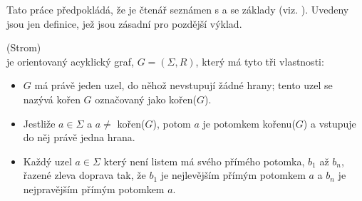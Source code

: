 Tato práce předpokládá, že je čtenář seznámen s  a
se základy  (viz. \cite{MedunaIFJ}).
Uvedeny jsou jen definice, jež jsou zásadní pro pozdější výklad.

\begin{defn}
  (Strom)\\
   je orientovaný acyklický graf, $G = (\Sigma, R)$, který má tyto
  tři vlastnosti:
  \begin{itemize}
    \item   $G$ má právě jeden uzel, do něhož nevstupují žádné hrany;
      tento uzel se nazývá kořen $G$ označovaný jako kořen($G$).
    \item Jestliže $a \in \Sigma$ a $a \neq$ kořen($G$), potom $a$ je
    potomkem kořenu($G$) a vstupuje do něj právě jedna hrana.
    \item   Každý uzel $a \in \Sigma$ který není listem má svého přímého potomka,
      $b_1$ až $b_n$, řazené zleva doprava tak, že $b_1$ je
      nejlevějším přímým potomkem $a$ a $b_n$ je nejpravějším přímým
      potomkem $a$.
  \end{itemize}
  \vspace{-0.5cm}
\end{defn}

